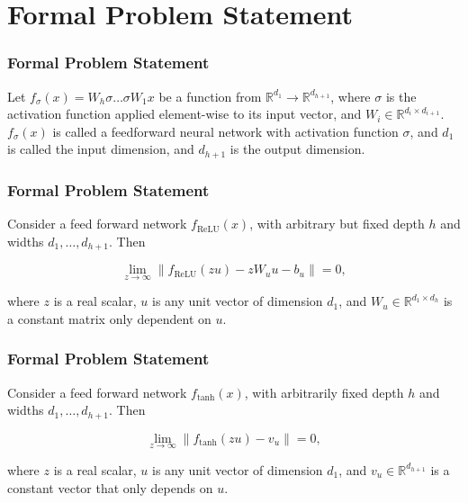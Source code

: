 \documentclass[aspectratio=169, 12pt]{beamer}
\begin{document}
\section{Formal Problem Statement}
\begin{frame}
\frametitle{Formal Problem Statement}
\begin{definition}
Let $f_{\sigma}(x) = W_{h} \sigma \ldots \sigma W_{1} x$ be a function from $\mathbb{R}^{d_{1}} \rightarrow \mathbb{R}^{d_{h+1}}$, where $\sigma$ is the activation function applied element-wise to its input vector, and $W_{i} \in \mathbb{R}^{d_{i} \times d_{i+1}}$. $f_{\sigma}(x)$ is called a feedforward neural network with activation function $\sigma$, and $d_{1}$ is called the input dimension, and $d_{h+1}$ is the output dimension.
\end{definition}
\end{frame}

\begin{frame}
\frametitle{Formal Problem Statement}
\begin{theorem}
Consider a feed forward network $f_{\text{ReLU}}(x)$, with arbitrary but fixed depth $h$ and widths $d_{1}, \ldots, d_{h+1}$. Then

$$ \lim_{z \to \infty} \| f_{\text{ReLU}}(zu) - z W_{u} u - b_{u} \| = 0, $$

where $z$ is a real scalar, $u$ is any unit vector of dimension $d_{1}$, and $W_{u} \in \mathbb{R}^{d_{1} \times d_{h}}$ is a constant matrix only dependent on $u$.
\end{theorem}
\end{frame}


\begin{frame}
\frametitle{Formal Problem Statement}
\begin{theorem}
Consider a feed forward network $f_{\text{tanh}}(x)$, with arbitrarily fixed depth $h$ and widths $d_{1}, \ldots, d_{h+1}$. Then

$$ \lim_{z \to \infty} \| f_{\text{tanh}}(zu) - v_{u} \| = 0, $$

where $z$ is a real scalar, $u$ is any unit vector of dimension $d_{1}$, and $v_{u} \in \mathbb{R}^{d_{h+1}}$ is a constant vector that only depends on $u$.
\end{theorem}
\end{frame}

\end{document}

